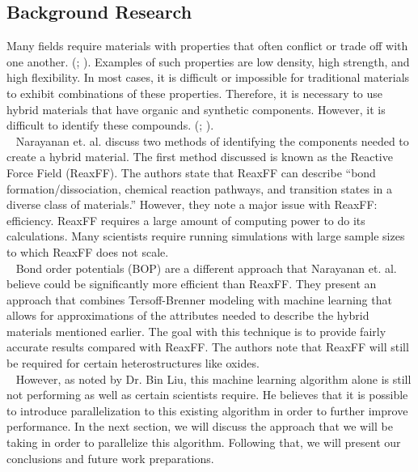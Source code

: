 \documentclass[letterpaper, 12pt]{article}
\begin{document}
\begin{flushleft}

\section*{Background Research}
Many fields require materials with properties that often conflict or trade off with one another. (\cite{C7NR06038F}; \cite{Ritchie}).  Examples of such properties are low density, high strength, and high flexibility.  In most cases, it is difficult or impossible for traditional materials to exhibit combinations of these properties. Therefore, it is necessary to use hybrid materials that have organic and synthetic components. However, it is difficult to identify these compounds. (\cite{C7NR06038F}; \cite{Wight}).\\
~\newline
Narayanan et. al. discuss two methods of identifying the components needed to create a hybrid material. The first
method discussed is known as the Reactive Force Field (ReaxFF). The authors state that ReaxFF can describe ``bond formation/dissociation, chemical reaction pathways, and transition states in a diverse class of materials.'' However, they note a major issue with ReaxFF: efficiency. ReaxFF requires a large amount of computing power to do its calculations. Many scientists require running simulations with large sample sizes to which ReaxFF does not scale. \\
~\newline
Bond order potentials (BOP) are a different approach that Narayanan et. al. believe could be significantly more
efficient than ReaxFF. They present an approach that combines Tersoff-Brenner modeling with machine learning that
allows for approximations of the attributes needed to describe the hybrid materials mentioned earlier. The goal
with this technique is to provide fairly accurate results compared with ReaxFF. The authors note that
ReaxFF will still be required for certain heterostructures like oxides. \\
~\newline
However, as noted by Dr. Bin Liu, this machine learning algorithm alone is still not performing as well as 
certain scientists require. He believes that it is possible to introduce parallelization to this existing
algorithm in order to further improve performance. In the next section, we will discuss the approach that we
will be taking in order to parallelize this algorithm.  Following that, we will present our conclusions and future work preparations.


\end{flushleft}
\end{document}
